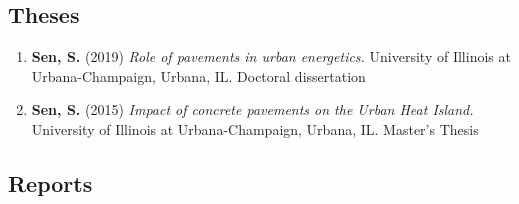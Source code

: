 \documentclass[12pt]{article}
\begin{document}
\hfill
\subsection*{Theses}
\begin{enumerate}
	\item \textbf{Sen, S.} (2019) \textit{Role of pavements in urban energetics.} University of Illinois at Urbana-Champaign, Urbana, IL. Doctoral dissertation
	\item \textbf{Sen, S.} (2015) \textit{Impact of concrete pavements on the 		Urban Heat Island.} University of Illinois at Urbana-Champaign, Urbana, IL. Master’s Thesis
\end{enumerate}

\hfill
\subsection*{Reports}
\end{document}
